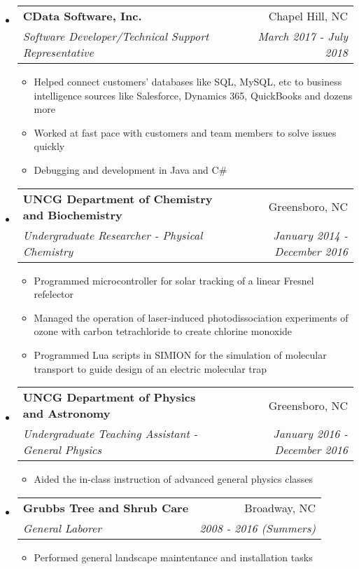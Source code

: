 \documentclass[letterpaper,11pt]{article}
\makeatletter
\newcommand{\resitem}[1]{\item #1 \vspace{-2pt}}
\newcommand{\ressubheading}[4]{
\begin{tabular*}{6.5in}{l@{\cftdotfill{\cftsecdotsep}\extracolsep{\fill}}r}
		\textbf{#1} & #2 \\
		\textit{#3} & \textit{#4} \\
\end{tabular*}\vspace{-6pt}}
\makeatother
\begin{document}
\begin{itemize}
\begin{itemize}
	\end{itemize}

\item
	\ressubheading{CData Software, Inc.}{Chapel Hill, NC}{Software Developer/Technical Support Representative}{March 2017 - July 2018}
	\begin{itemize}
      \resitem{Helped connect customers' databases like SQL, MySQL, etc to business intelligence sources like Salesforce, Dynamics 365, QuickBooks and dozens more }
      \resitem{Worked at fast pace with customers and team members to solve issues quickly}
      \resitem{Debugging and development in Java and C\#}
      
	\end{itemize}

\item
	\ressubheading{UNCG Department of Chemistry and Biochemistry}{Greensboro, NC}{Undergraduate Researcher - Physical Chemistry}{January 2014 - December 2016}
	\begin{itemize}
      \resitem{Programmed microcontroller for solar tracking of a linear Fresnel refelector }
      \resitem{Managed the operation of laser-induced photodissociation experiments of ozone with carbon tetrachloride to create chlorine monoxide}
      \resitem{Programmed Lua scripts in SIMION for the simulation of molecular transport to guide design of an electric molecular trap
}
	\end{itemize}

\item
	\ressubheading{UNCG Department of Physics and Astronomy}{Greensboro, NC}{Undergraduate Teaching Assistant - General Physics}{January 2016 - December 2016}
	\begin{itemize}
      \resitem{Aided the in-class instruction of advanced general physics classes}
     
	\end{itemize}
	
\item
	\ressubheading{Grubbs Tree and Shrub Care}{Broadway, NC}{General Laborer}{2008 - 2016 (Summers)}
	\begin{itemize}
      \resitem{Performed general landscape maintentance and installation tasks}
     
	\end{itemize}

\end{itemize}

%

\end{document}

